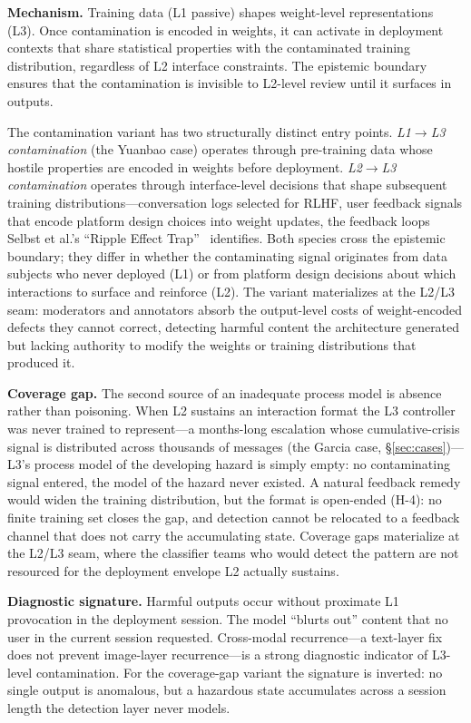 \textbf{Mechanism.} Training data (L1 passive) shapes weight-level representations (L3). Once contamination is encoded in weights, it can activate in deployment contexts that share statistical properties with the contaminated training distribution, regardless of L2 interface constraints. The epistemic boundary ensures that the contamination is invisible to L2-level review until it surfaces in outputs.

The contamination variant has two structurally distinct entry points. \textit{L1$\to$L3 contamination} (the Yuanbao case) operates through pre-training data whose hostile properties are encoded in weights before deployment. \textit{L2$\to$L3 contamination} operates through interface-level decisions that shape subsequent training distributions---conversation logs selected for RLHF, user feedback signals that encode platform design choices into weight updates, the feedback loops Selbst et al.'s ``Ripple Effect Trap''~\cite{selbst2019fairness} identifies. Both species cross the epistemic boundary; they differ in whether the contaminating signal originates from data subjects who never deployed (L1) or from platform design decisions about which interactions to surface and reinforce (L2). The variant materializes at the L2/L3 seam: moderators and annotators absorb the output-level costs of weight-encoded defects they cannot correct, detecting harmful content the architecture generated but lacking authority to modify the weights or training distributions that produced it.

\textbf{Coverage gap.} The second source of an inadequate process model is absence rather than poisoning. When L2 sustains an interaction format the L3 controller was never trained to represent---a months-long escalation whose cumulative-crisis signal is distributed across thousands of messages (the Garcia case, \S\ref{sec:cases})---L3's process model of the developing hazard is simply empty: no contaminating signal entered, the model of the hazard never existed. A natural feedback remedy would widen the training distribution, but the format is open-ended (H-4): no finite training set closes the gap, and detection cannot be relocated to a feedback channel that does not carry the accumulating state. Coverage gaps materialize at the L2/L3 seam, where the classifier teams who would detect the pattern are not resourced for the deployment envelope L2 actually sustains.

\textbf{Diagnostic signature.} Harmful outputs occur without proximate L1 provocation in the deployment session. The model ``blurts out'' content that no user in the current session requested. Cross-modal recurrence---a text-layer fix does not prevent image-layer recurrence---is a strong diagnostic indicator of L3-level contamination. For the coverage-gap variant the signature is inverted: no single output is anomalous, but a hazardous state accumulates across a session length the detection layer never models.

